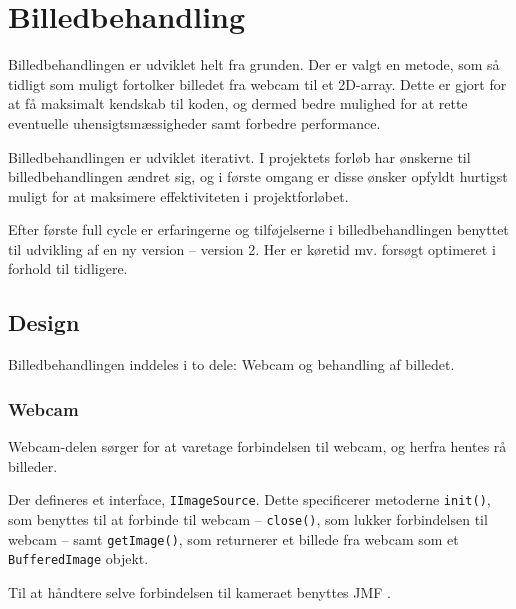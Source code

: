 \chapter{Billedbehandling}\label{cha:ip}
Billedbehandlingen er udviklet helt fra grunden. Der er valgt en metode, som så tidligt som muligt fortolker billedet fra webcam til et 2D-array. Dette er gjort for at få maksimalt kendskab til koden, og dermed bedre mulighed for at rette eventuelle uhensigtsmæssigheder samt forbedre performance.

Billedbehandlingen er udviklet iterativt. I projektets forløb har ønskerne til billedbehandlingen ændret sig, og i første omgang er disse ønsker opfyldt hurtigst muligt for at maksimere effektiviteten i projektforløbet.

Efter første full cycle er erfaringerne og tilføjelserne i billedbehandlingen benyttet til udvikling af en ny version -- version 2. Her er køretid mv. forsøgt optimeret i forhold til tidligere.

\section{Design}
Billedbehandlingen inddeles i to dele: Webcam og behandling af billedet.

\subsection{Webcam}
Webcam-delen sørger for at varetage forbindelsen til webcam, og herfra hentes rå billeder.

Der defineres et interface, \texttt{IImageSource}. Dette specificerer metoderne \texttt{init()}, som benyttes til at forbinde til webcam -- \texttt{close()}, som lukker forbindelsen til webcam -- samt \texttt{getImage()}, som returnerer et billede fra webcam som et \texttt{BufferedImage} objekt.

Til at håndtere selve forbindelsen til kameraet benyttes JMF .

\begin{comment}
Opbygning
	Webcam -> behandling
	JMF
\end{comment}

